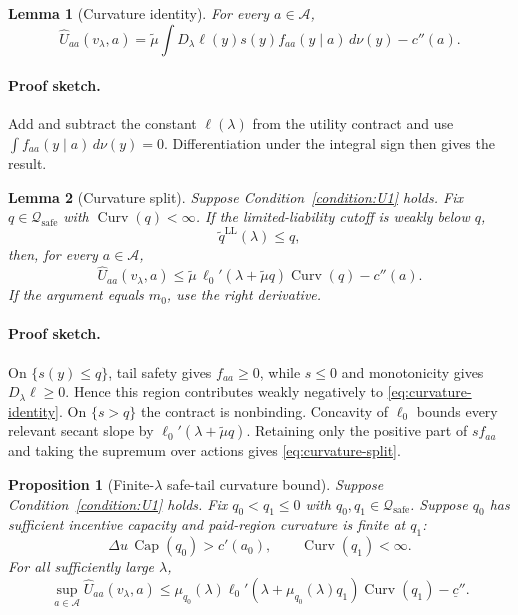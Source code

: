 \documentclass[11pt]{article}
\newtheorem{proposition}{Proposition}
\newtheorem{lemma}{Lemma}
\theoremstyle{remark}
\newcommand{\dd}{\,d\nu}
\newcommand{\cA}{\mathcal A}
\newcommand{\cQ}{\mathcal Q}
\DeclareMathOperator{\Capacity}{Cap}
\DeclareMathOperator{\Curv}{Curv}
\newcommand{\proofsketch}{\paragraph{Proof sketch.}}
\begin{document}
\begin{lemma}[Curvature identity]
\label{lem:curvature-identity}
For every $a\in\cA$,
\begin{equation}
 \widehat U_{aa}(v_\lambda,a)
 =\widetilde\mu
 \int D_\lambda\ell(y)s(y)f_{aa}(y\mid a)\dd(y)-c''(a).
 \tag{Curv}\label{eq:curvature-identity}
\end{equation}
\end{lemma}

\proofsketch
Add and subtract the constant $\ell(\lambda)$ from the utility contract and use
$\int f_{aa}(y\mid a)\dd(y)=0$.  Differentiation under the integral sign then
gives the result.

\begin{lemma}[Curvature split]
\label{lem:curvature-split}
Suppose Condition~\eqref{condition:U1} holds.  Fix
$q\in\cQ_{\mathrm{safe}}$ with $\Curv(q)<\infty$.  If the limited-liability cutoff
is weakly below $q$,
\[
 \widetilde q^{\mathrm{LL}}(\lambda)\le q,
\]
then, for every $a\in\cA$,
\begin{equation}
 \widehat U_{aa}(v_\lambda,a)
 \le
 \widetilde\mu\,\ell_0'(\lambda+\widetilde\mu q)\Curv(q)-c''(a).
 \tag{Split}\label{eq:curvature-split}
\end{equation}
If the argument equals $m_0$, use the right derivative.
\end{lemma}

\proofsketch
On $\{s(y)\le q\}$, tail safety gives $f_{aa}\ge0$, while $s\le0$ and monotonicity gives
$D_\lambda\ell\ge0$.  Hence this region contributes weakly negatively to
\eqref{eq:curvature-identity}.  On $\{s>q\}$ the contract is nonbinding.
Concavity of $\ell_0$ bounds every relevant secant slope by
$\ell_0'(\lambda+\widetilde\mu q)$.  Retaining only the positive part of
$s f_{aa}$ and taking the supremum over actions gives \eqref{eq:curvature-split}.

\begin{proposition}[Finite-$\lambda$ safe-tail curvature bound]
\label{prop:deterministic-criterion}
Suppose Condition~\eqref{condition:U1} holds.  Fix
$q_0<q_1\le0$ with $q_0,q_1\in\cQ_{\mathrm{safe}}$.  Suppose $q_0$
has sufficient incentive capacity and paid-region curvature is finite at $q_1$:
\[
 \Delta u\,\Capacity(q_0)>c'(a_0),
 \qquad
 \Curv(q_1)<\infty.
\]
For all sufficiently large $\lambda$,
\begin{equation}
 \sup_{a\in\cA}\widehat U_{aa}(v_\lambda,a)
 \le
 \mu_{q_0}(\lambda)
 \ell_0'(\lambda+\mu_{q_0}(\lambda)q_1)\Curv(q_1)-\underline c''.
 \tag{DC-$\lambda$}\label{eq:deterministic-finite}
\end{equation}
\end{proposition}
\end{document}
